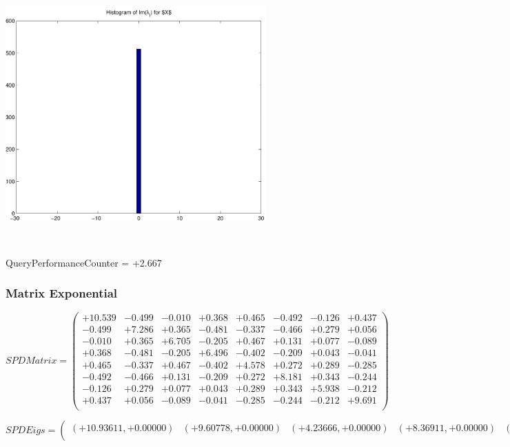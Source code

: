 \documentclass[9pt]{article}
\theoremstyle{plain}
\theoremstyle{definition}
\theoremstyle{remark}
\numberwithin{equation}{section}
\begin{document}
\includegraphics[width=10.0cm,height=10.0cm]{Im_lambda_n.pdf}

QueryPerformanceCounter  =  +2.667
\subsubsection{Matrix Exponential }
$SPD Matrix = \left(
\begin{array}{
cccccccc}
+10.539 & -0.499 & -0.010 & +0.368 & +0.465 & -0.492 & -0.126 & +0.437 \\
-0.499 & +7.286 & +0.365 & -0.481 & -0.337 & -0.466 & +0.279 & +0.056 \\
-0.010 & +0.365 & +6.705 & -0.205 & +0.467 & +0.131 & +0.077 & -0.089 \\
+0.368 & -0.481 & -0.205 & +6.496 & -0.402 & -0.209 & +0.043 & -0.041 \\
+0.465 & -0.337 & +0.467 & -0.402 & +4.578 & +0.272 & +0.289 & -0.285 \\
-0.492 & -0.466 & +0.131 & -0.209 & +0.272 & +8.181 & +0.343 & -0.244 \\
-0.126 & +0.279 & +0.077 & +0.043 & +0.289 & +0.343 & +5.938 & -0.212 \\
+0.437 & +0.056 & -0.089 & -0.041 & -0.285 & -0.244 & -0.212 & +9.691 \\
\end{array}
\right)$ \newline 

$SPD Eigs = \left(
\begin{array}{
cccccccc}
(+10.93611,+0.00000) & (+9.60778,+0.00000) & (+4.23666,+0.00000) & (+8.36911,+0.00000) & (+7.56229,+0.00000) & (+5.82791,+0.00000) & (+6.54198,+0.00000) & (+6.33139,+0.00000) \\
\end{array}
\right)$ \newline 
\end{document}
